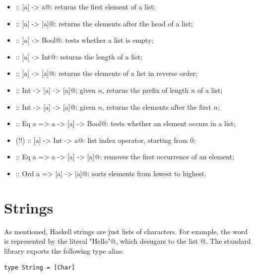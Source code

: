 \documentclass[UdineBachThesis,american,11pt]{PhdThesis}
\begin{document}
  \begin{itemize}
    \item \lstinline@head :: [a] -> a@: returns the first element of a list;

    \item \lstinline@tail :: [a] -> [a]@: returns the elements after the head of
    a list;

    \item \lstinline@null :: [a] -> Bool@: tests whether a list is empty;

    \item \lstinline@length :: [a] -> Int@: returns the length of a list;

    \item \lstinline@reverse :: [a] -> [a]@: returns the elements of a list in
    reverse order;

    \item \lstinline@take :: Int -> [a] -> [a]@: given $n$, returns the prefix
    of length $n$ of a list;

    \item \lstinline@drop :: Int -> [a] -> [a]@: given $n$, returns the elements
    after the first $n$;

    \item \lstinline@elem :: Eq a => a -> [a] -> Bool@: tests whether an element
    occurs in a list;

    \item \lstinline@(!!) :: [a] -> Int -> a@: list index operator, starting
    from $0$;

    \item \lstinline@delete :: Eq a => a -> [a] -> [a]@: removes the first
    occurrence of an element;

    \item \lstinline@sort :: Ord a => [a] -> [a]@: sorts elements from lowest to
    highest.
  \end{itemize}

  \section{Strings}

  As mentioned, Haskell strings are just lists of characters. For example, the
  word \lstinline@Hello@ is represented by the literal \lstinline@"Hello"@,
  which desugars to the list \lstinline@['H', 'e', 'l', 'l', 'o']@. The standard
  library exports the following type alias:

  \begin{lstlisting}[gobble=4,basicstyle=\ttfamily\small]
    type String = [Char]
  \end{lstlisting}
\end{document}
